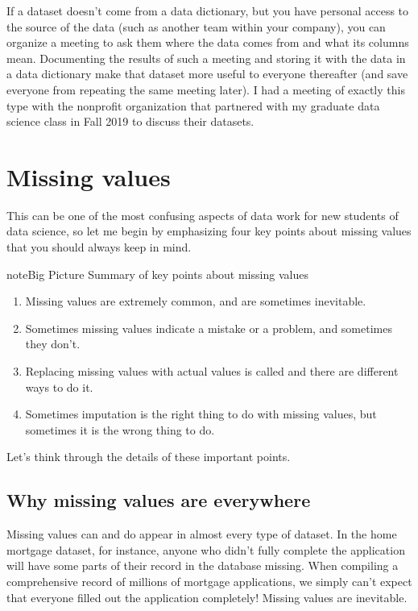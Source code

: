 \documentclass[letterpaper,10pt,english]{sphinxmanual}
\begin{document}
If a dataset doesn’t come from a data dictionary, but you have personal access to the source of the data (such as another team within your company), you can organize a meeting to ask them where the data comes from and what its columns mean.  Documenting the results of such a meeting and storing it with the data in a data dictionary make that dataset more useful to everyone thereafter (and save everyone from repeating the same meeting later).  I had a meeting of exactly this type with the nonprofit organization that partnered with my graduate data science class in Fall 2019 to discuss their datasets.


\section{Missing values}
\label{\detokenize{chapter-13-etl:missing-values}}
This can be one of the most confusing aspects of data work for new students of data science, so let me begin by emphasizing four key points about missing values that you should always keep in mind.

\begin{sphinxadmonition}{note}{Big Picture \sphinxhyphen{} Summary of key points about missing values}
\begin{enumerate}
%
\item {} 
Missing values are extremely common, and are sometimes inevitable.

\item {} 
Sometimes missing values indicate a mistake or a problem, and sometimes they don’t.

\item {} 
Replacing missing values with actual values is called  and there are  different ways to do it.

\item {} 
Sometimes imputation is the right thing to do with missing values, but sometimes it is the wrong thing to do.

\end{enumerate}
\end{sphinxadmonition}

Let’s think through the details of these important points.


\subsection{Why missing values are everywhere}
\label{\detokenize{chapter-13-etl:why-missing-values-are-everywhere}}
Missing values can and do appear in almost every type of dataset.  In the home mortgage dataset, for instance, anyone who didn’t fully complete the application will have some parts of their record in the database missing.  When compiling a comprehensive record of millions of mortgage applications, we simply can’t expect that everyone filled out the application completely!  Missing values are inevitable.
\end{document}
